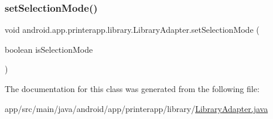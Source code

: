 \subsubsection{\texorpdfstring{set\+Selection\+Mode()}{setSelectionMode()}}
{\footnotesize\ttfamily void android.\+app.\+printerapp.\+library.\+Library\+Adapter.\+set\+Selection\+Mode (\begin{DoxyParamCaption}\item[{boolean}]{is\+Selection\+Mode }\end{DoxyParamCaption})}



The documentation for this class was generated from the following file\+:\begin{DoxyCompactItemize}
\item 
app/src/main/java/android/app/printerapp/library/\hyperlink{_library_adapter_8java}{Library\+Adapter.\+java}\end{DoxyCompactItemize}
